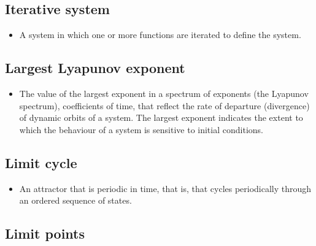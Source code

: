 \documentclass[12pt,]{book}
\providecommand{\tightlist}{%
  \setlength{\itemsep}{0pt}\setlength{\parskip}{0pt}}
\begin{document}
\hypertarget{Iter42}{%
\subsection*{\texorpdfstring{\textbf{Iterative system}}{Iterative system}}\label{Iter42}}

\begin{itemize}
\tightlist
\item
  A system in which one or more functions are iterated to define the system.
\end{itemize}

\hypertarget{Larg43}{%
\subsection*{\texorpdfstring{\textbf{Largest Lyapunov exponent}}{Largest Lyapunov exponent}}\label{Larg43}}

\begin{itemize}
\tightlist
\item
  The value of the largest exponent in a spectrum of exponents (the Lyapunov spectrum), coefficients of time, that reflect the rate of departure (divergence) of dynamic orbits of a system. The largest exponent indicates the extent to which the behaviour of a system is sensitive to initial conditions.
\end{itemize}

\hypertarget{Limi44}{%
\subsection*{\texorpdfstring{\textbf{Limit cycle}}{Limit cycle}}\label{Limi44}}

\begin{itemize}
\tightlist
\item
  An attractor that is periodic in time, that is, that cycles periodically through an ordered sequence of states.
\end{itemize}

\hypertarget{Limi45}{%
\subsection*{\texorpdfstring{\textbf{Limit points}}{Limit points}}\label{Limi45}}
\end{document}
